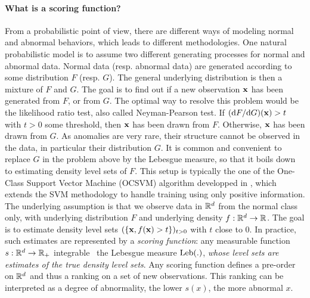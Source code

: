 \paragraph{What is a scoring function?}
From a probabilistic point of view, there are different ways of modeling normal and abnormal behaviors, which leads to different methodologies. One natural probabilistic model is to assume two different generating processes for normal and abnormal data. Normal data (resp. abnormal data) are generated according to some distribution $F$ (resp. $G$). The general underlying distribution is then a mixture of $F$ and $G$. The goal is to find out if a new observation $\mathbf x$ has been generated from $F$, or from $G$. The optimal way to resolve %
this problem would be the likelihood ratio test, also called Neyman-Pearson test. If $(\mathrm{d}  F / \mathrm{d}  G) ( \mathbf x) > t$ with $t>0$ some threshold, then $\mathbf x$ has been drawn from $F$. Otherwise, $\mathbf x$ has been drawn from $G$. %
%
As anomalies are very rare, their structure cannot be observed in the data, in particular their distribution $G$. 
%
It is common and convenient \cite{Vert06thesis} to replace $G$ in the problem above by the Lebesgue measure, so that it boils down to estimating density level sets of $F$. 
%
This setup is typically the one of the One-Class Support Vector Machine (OCSVM) algorithm developped in \cite{Scholkopf2001}, which extends the SVM methodology \cite{Cortes1995, Shawe2004} to handle training using only positive information.
The underlying assumption is that we observe data in $\mathbb{R}^d$ from the normal class only, with underlying distribution $F$ and underlying density $f: \mathbb{R}^d \to \mathbb{R}$. The goal is to estimate density level sets $(\{\mathbf x, f( \mathbf x) > t\})_{t>0}$ with $t$ close to $0$.
%
In practice, such estimates are represented by a \emph{scoring function}: any measurable function $s: \mathbb{R}^d \to \mathbb{R}_+$ integrable \wrt~the Lebesgue measure $\text{Leb}(.)$, \emph{whose level sets are estimates of the true density level sets}. 
Any scoring function defines a pre-order on $\mathbb{R}^d$ and thus a ranking on a set of new observations. This ranking can be interpreted as a degree of abnormality, the lower $s(x)$, the more abnormal $x$. 
